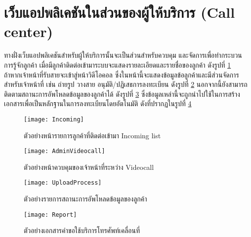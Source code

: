 \section{เว็บแอปพลิเคชันในส่วนของผู้ให้บริการ (Call center)}
ทางฝั่งเว็บแอปพลิเคชันสำหรับผู้ให้บริการนั้นจะเป็นส่วนสำหรับควบคุม และจัดการเพื่อทำกระบวน การรู้จักลูกค้า เมื่อมีลูกค้าติดต่อเข้ามาระบบจะแสดงรายละเอียดและรายชื่อของลูกค้า ดังรูปที่ \ref{Fig:incoming} \\ถ้าหากเจ้าหน้าที่รับสายจะเข้าสู่หน้าวิดีโอคอล ซึ่งในหน้านี้จะแสดงข้อมูลข้อลูกค้าและมีส่วนจัดการสำหรับเจ้าหน้าที่ เช่น ถ่ายรูป วางสาย อนุมัติ/ปฏิเสธการลงทะเบียน ดังรูปที่ \ref{Fig:adminVideocall}  นอกจากนี้ยังสามารถติดตามสถานะการอัพโหลดข้อมูลของลูกค้าได้ ดังรูปที่ \ref{Fig:upload} ซึ่งข้อมูลเหล่านี้จะถูกนำไปใช้ในการสร้างเอกสารเพื่อเป็นหลักฐานในการลงทะเบียนโดยอัตโนมัติ ดังที่ปรากฏในรูปที่ \ref{Fig:report}
\begin{figure}[h]
	\centering
	\texttt{[image: Incoming]}
	\caption{ตัวอย่างหน้ารายการลูกค้าที่ติดต่อเข้ามา Incoming list}
	\label{Fig:incoming}
\end{figure}
\begin{figure}[h]
	\centering
	\texttt{[image: AdminVideocall]}
	\caption{ตัวอย่างหน้าควบคุมของเจ้าหน้าที่ระหว่าง Videocall}
	\label{Fig:adminVideocall}
\end{figure}
\begin{figure}[h]
	\centering
	\texttt{[image: UploadProcess]}
	\caption{ตัวอย่างรายการสถานะการอัพโหลดข้อมูลของลูกค้า}
	\label{Fig:upload}
\end{figure}
\begin{figure}[h]
	\centering
	\texttt{[image: Report]}
	\caption{ตัวอย่างเอกสารคำขอใช้บริการโทรศัพท์เคลื่อนที่}
	\label{Fig:report}
\end{figure}